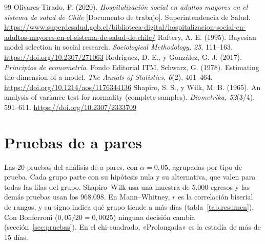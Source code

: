 \documentclass[10.5pt,a4paper,headings=small,abstract=false,bibliography=totoc,listof=totoc]{scrartcl}
\begin{document}
\begin{thebibliography}{99}
 Olivares-Tirado, P. (2020). \emph{Hospitalización social en adultos mayores en el sistema de salud de Chile} [Documento de trabajo]. Superintendencia de Salud. \url{https://www.superdesalud.gob.cl/biblioteca-digital/hospitalizacion-social-en-adultos-mayores-en-el-sistema-de-salud-de-chile/}
 Raftery, A. E. (1995). Bayesian model selection in social research. \emph{Sociological Methodology, 25}, 111--163. \url{https://doi.org/10.2307/271063}
 Rodríguez, D. E., y González, G. J. (2017). \emph{Principios de econometría}. Fondo Editorial ITM.
 Schwarz, G. (1978). Estimating the dimension of a model. \emph{The Annals of Statistics, 6}(2), 461--464. \url{https://doi.org/10.1214/aos/1176344136}
 Shapiro, S. S., y Wilk, M. B. (1965). An analysis of variance test for normality (complete samples). \emph{Biometrika, 52}(3/4), 591--611. \url{https://doi.org/10.2307/2333709}
\end{thebibliography}

\appendix
\renewcommand*{\sectionformat}{Anexo~\thesection.\enskip}
\renewcommand*{\addsectiontocentry}[2]{\addtocentrydefault{section}{}{Anexo~#1.\enskip #2}}
\renewcommand{\thetable}{\thesection\arabic{table}}
\renewcommand{\thefigure}{\thesection\arabic{figure}}

\clearpage
\section{Pruebas de a pares}\label{anx:pares}

Las 20 pruebas del análisis de a pares, con $\alpha=0{,}05$, agrupadas por tipo de prueba. Cada grupo parte con su hipótesis nula y su alternativa, que valen para todas las filas del grupo. Shapiro--Wilk usa una muestra de 5.000 egresos y las demás pruebas usan los 968.098. En Mann--Whitney, $r$ es la correlación biserial de rangos, y su signo indica qué grupo tiende a más días (tabla~\ref{tab:resumen}). Con Bonferroni ($0{,}05/20=0{,}0025$) ninguna decisión cambia (sección~\ref{sec:pruebas}). En el chi-cuadrado, «Prolongada» es la estadía de más de 15 días.
\end{document}
